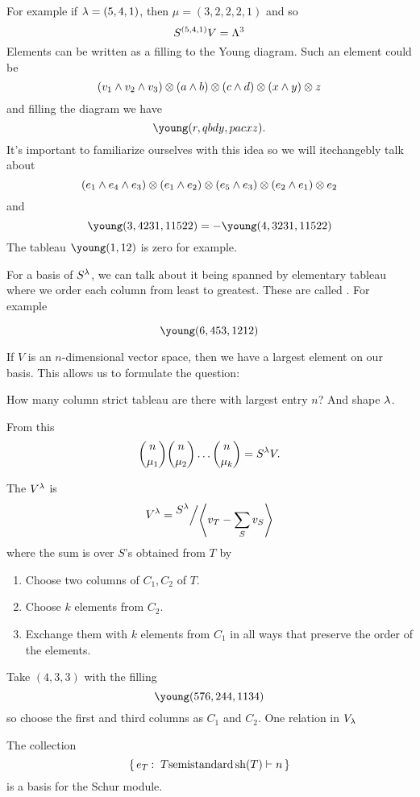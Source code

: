 \documentclass[12pt]{memoir}
\begin{document}
\begin{Ex}
    For example if $\lambda=(5,4,1)$, then $\mu=(3,2,2,2,1)$ and so 
    $$S^{(5,4,1)}V=\Lambda^3$$
    Elements can be written as a filling to the Young diagram. Such an element could be 
    $$(v_1\land v_2\land v_3)\otimes(a\land b)\otimes (c\land d)\otimes (x\land y)\otimes z$$
    and filling the diagram we have
    $$
    \young(r,qbdy,pacxz).
$$
It's important to familiarize ourselves with this idea so we will itechangebly talk about 
$$(e_1\wedge e_4\wedge e_3)\otimes(e_1\wedge e_2)\otimes (e_5\wedge e_3)\otimes(e_2\wedge e_1)\otimes e_2$$
and 
$$\young(3,4231,11522)=-\young(4,3231,11522)$$
The tableau $\young(1,12)$ is zero for example.
\end{Ex}

For a basis of $S^\lambda$, we can talk about it being spanned by elementary tableau where we order each column from least to greatest. These are called . For example

$$\young(6,453,1212)$$

If $V$ is an $n$-dimensional vector space, then we have a largest element on our basis. This allows us to formulate the question:
\begin{significant}
How many column strict tableau are there with largest entry $n$? And shape $\lambda$.
\end{significant}
From this 
$$\binom{n}{\mu_1}\binom{n}{\mu_2}\dots\binom{n}{\mu_k}=S^\lambda V.$$

\begin{Def}
    The  $V^\lambda$ is 
    $$V^\la=\quot{S^\la}{\genr{v_T-\sum_S v_S}}$$
    where the sum is over $S$'s obtained from $T$ by
    \begin{enumerate}
        \item Choose two columns of $C_1,C_2$ of $T$.
        \item Choose $k$ elements from $C_2$.
        \item Exchange them with $k$ elements from $C_1$ in all ways that preserve the order of the elements.
    \end{enumerate}
\end{Def}

\begin{Ex}
    Take $(4,3,3)$ with the filling 
    $$\young(576,244,1134)$$
    so choose the first and third columns as $C_1$ and $C_2$. One relation in $V_\lambda$
\end{Ex}

\begin{Th}
    The collection 
    $$\{\,e_T\mathbin{:}\ T \text{semistandard} \operatorname{sh}(T)\vdash n\,\}$$
    is a basis for the Schur module.
\end{Th}
\end{document}
